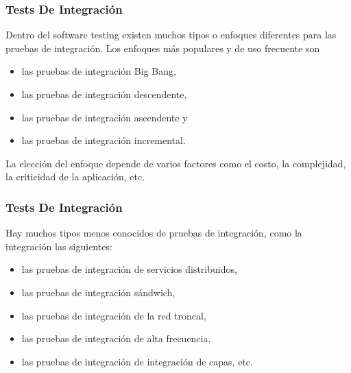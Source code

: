 \begin{frame}
    \frametitle{Tests De Integración}

    Dentro del software testing existen muchos tipos o enfoques diferentes
    para las pruebas de integración. Los enfoques más populares y de uso
    frecuente son

    \begin{itemize}
        \item las pruebas de integración Big Bang, 
        \item las pruebas de integración descendente, 
        \item las pruebas de integración ascendente y 
        \item las pruebas de integración incremental.
    \end{itemize}
    
    La elección del enfoque depende de varios factores como el costo, la 
    complejidad, la criticidad de la aplicación, etc.

\end{frame}

\begin{frame}
    \frametitle{Tests De Integración}

    Hay muchos tipos menos conocidos de pruebas de integración, como la 
    integración las siguientes:

    \begin{itemize}
        \item las pruebas de integración de servicios distribuidos,
        \item las pruebas de integración sándwich, 
        \item las pruebas de integración de la red troncal,
        \item las pruebas de integración de alta frecuencia,
        \item las pruebas de integración de integración de capas, etc.
    \end{itemize}
    
\end{frame}

